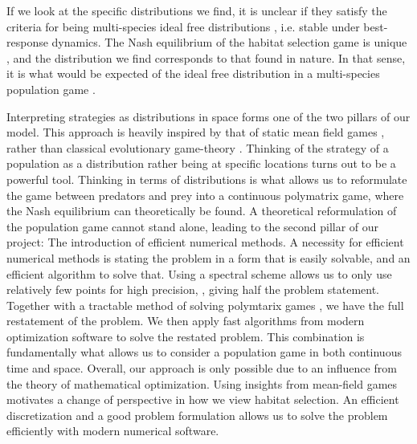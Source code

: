 If we look at the specific distributions we find, it is unclear if they satisfy the criteria for being multi-species ideal free distributions \citep{kvrivan2008ideal}, i.e. stable under best-response dynamics. The Nash equilibrium of the habitat selection game is unique \citep{verticalmigration}, and the distribution we find corresponds to that found in nature. In that sense, it is what would be expected of the ideal free distribution in a multi-species population game \citep{cressman2004ideal}.


Interpreting strategies as distributions in space forms one of the two pillars of our model. This approach is heavily inspired by that of static mean field games \citep{lasry2007mean, blanchet2016optimal}, rather than classical evolutionary game-theory \cite{hofbauer1998evolutionary}. Thinking of the strategy of a population as a distribution rather being at specific locations turns out to be a powerful tool. Thinking in terms of distributions is what allows us to reformulate the game between predators and prey into a continuous polymatrix game, where the Nash equilibrium can theoretically be found. A theoretical reformulation of the population game cannot stand alone, leading to the second pillar of our project: The introduction of efficient numerical methods. A necessity for efficient numerical methods is stating the problem in a form that is easily solvable, and an efficient algorithm to solve that. Using a spectral scheme allows us to only use relatively few points for high precision, \citep{kopriva2009implementing}, giving half the problem statement. Together with a tractable method of solving polymtarix games \citep{miller1991copositive}, we have the full restatement of the problem. We then apply fast algorithms from modern optimization software \citep{Andersson2019, acary2019introduction} to solve the restated problem. This combination is fundamentally what allows us to consider a population game in both continuous time and space.
Overall, our approach is only possible due to an influence from the theory of mathematical optimization. Using insights from mean-field games motivates a change of perspective in how we view habitat selection. An efficient discretization and a good problem formulation allows us to solve the problem efficiently with modern numerical software.





